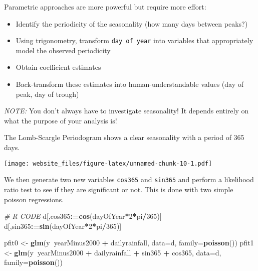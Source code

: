 \documentclass[]{book}
\newenvironment{Shaded}{\begin{snugshade}}{\end{snugshade}}
\newcommand{\KeywordTok}[1]{\textcolor[rgb]{0.13,0.29,0.53}{\textbf{#1}}}
\newcommand{\DataTypeTok}[1]{\textcolor[rgb]{0.13,0.29,0.53}{#1}}
\newcommand{\DecValTok}[1]{\textcolor[rgb]{0.00,0.00,0.81}{#1}}
\newcommand{\StringTok}[1]{\textcolor[rgb]{0.31,0.60,0.02}{#1}}
\newcommand{\CommentTok}[1]{\textcolor[rgb]{0.56,0.35,0.01}{\textit{#1}}}
\newcommand{\OperatorTok}[1]{\textcolor[rgb]{0.81,0.36,0.00}{\textbf{#1}}}
\newcommand{\ErrorTok}[1]{\textcolor[rgb]{0.64,0.00,0.00}{\textbf{#1}}}
\newcommand{\NormalTok}[1]{#1}
\providecommand{\tightlist}{%
  \setlength{\itemsep}{0pt}\setlength{\parskip}{0pt}}
\begin{document}
Parametric approaches are more powerful but require more effort:

\begin{itemize}
\tightlist
\item
  Identify the periodicity of the seasonality (how many days between
  peaks?)
\item
  Using trigonometry, transform \texttt{day\ of\ year} into variables
  that appropriately model the observed periodicity
\item
  Obtain coefficient estimates
\item
  Back-transform these estimates into human-understandable values (day
  of peak, day of trough)
\end{itemize}

\emph{NOTE:} You don't always have to investigate seasonality! It
depends entirely on what the purpose of your analysis is!

The Lomb-Scargle Periodogram shows a clear seasonality with a period of
365 days.

\begin{Shaded}
\end{Shaded}

\texttt{[image: website\_files/figure-latex/unnamed-chunk-10-1.pdf]}

We then generate two new variables \texttt{cos365} and \texttt{sin365}
and perform a likelihood ratio test to see if they are significant or
not. This is done with two simple poisson regressions.

\begin{Shaded}
\begin{Highlighting}[]
\CommentTok{# R CODE}
\NormalTok{d[,cos365}\OperatorTok{:}\ErrorTok{=}\KeywordTok{cos}\NormalTok{(dayOfYear}\OperatorTok{*}\DecValTok{2}\OperatorTok{*}\NormalTok{pi}\OperatorTok{/}\DecValTok{365}\NormalTok{)]}
\NormalTok{d[,sin365}\OperatorTok{:}\ErrorTok{=}\KeywordTok{sin}\NormalTok{(dayOfYear}\OperatorTok{*}\DecValTok{2}\OperatorTok{*}\NormalTok{pi}\OperatorTok{/}\DecValTok{365}\NormalTok{)]}

\NormalTok{pfit0 <-}\StringTok{ }\KeywordTok{glm}\NormalTok{(y}\OperatorTok{~}\NormalTok{yearMinus2000 }\OperatorTok{+}\StringTok{ }\NormalTok{dailyrainfall, }\DataTypeTok{data=}\NormalTok{d, }\DataTypeTok{family=}\KeywordTok{poisson}\NormalTok{())}
\NormalTok{pfit1 <-}\StringTok{ }\KeywordTok{glm}\NormalTok{(y}\OperatorTok{~}\NormalTok{yearMinus2000 }\OperatorTok{+}\StringTok{ }\NormalTok{dailyrainfall }\OperatorTok{+}\StringTok{ }\NormalTok{sin365 }\OperatorTok{+}\StringTok{ }\NormalTok{cos365, }\DataTypeTok{data=}\NormalTok{d, }\DataTypeTok{family=}\KeywordTok{poisson}\NormalTok{())}
\end{Highlighting}
\end{Shaded}
\end{document}
